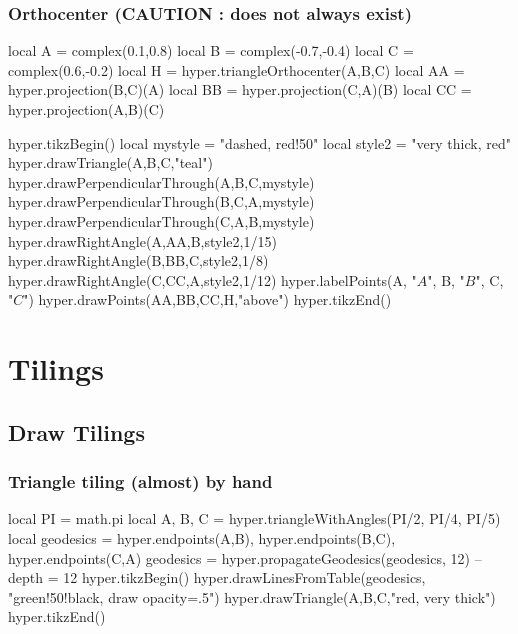\documentclass{article}
\begin{document}
\subsubsection{Orthocenter (CAUTION : does not always exist)}
\begin{codeandresult}
\begin{luacode*}
local A = complex(0.1,0.8)
local B = complex(-0.7,-0.4)
local C = complex(0.6,-0.2)
local H = hyper.triangleOrthocenter(A,B,C)
local AA = hyper.projection(B,C)(A)
local BB = hyper.projection(C,A)(B)
local CC = hyper.projection(A,B)(C)

hyper.tikzBegin()
local mystyle = "dashed, red!50"
local style2 = "very thick, red"
hyper.drawTriangle(A,B,C,"teal")
hyper.drawPerpendicularThrough(A,B,C,mystyle)
hyper.drawPerpendicularThrough(B,C,A,mystyle)
hyper.drawPerpendicularThrough(C,A,B,mystyle)
hyper.drawRightAngle(A,AA,B,style2,1/15)
hyper.drawRightAngle(B,BB,C,style2,1/8)
hyper.drawRightAngle(C,CC,A,style2,1/12)
hyper.labelPoints(A, "$A$", B, "$B$", C, "$C$")
hyper.drawPoints(AA,BB,CC,H,"above")
hyper.tikzEnd()
\end{luacode*}
\end{codeandresult}



\newpage

\section{Tilings}

\subsection{Draw Tilings}

\subsubsection{Triangle tiling (almost) by hand}
\begin{codeandresult}
\begin{luacode*}
local PI = math.pi
local A, B, C = hyper.triangleWithAngles(PI/2, PI/4, PI/5)
local geodesics = {
	{hyper.endpoints(A,B)},
	{hyper.endpoints(B,C)},
	{hyper.endpoints(C,A)}
}
geodesics = hyper.propagateGeodesics(geodesics, 12) -- depth = 12
hyper.tikzBegin()
hyper.drawLinesFromTable(geodesics, "green!50!black, draw opacity=.5")
hyper.drawTriangle(A,B,C,"red, very thick")
hyper.tikzEnd()
\end{luacode*}
\end{codeandresult}
\end{document}
